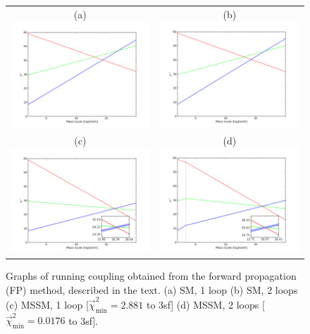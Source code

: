 \documentclass[12pt,a4paper,oneside]{article}
\begin{document}
\begin{figure}[th]
\begin{center}
\begin{tabular}{cc}
(a) \includegraphics[width=6.75cm]{figs/sm-1.png} & (b) \includegraphics[width=6.75cm]{figs/sm-2.png} \\
(c) \includegraphics[width=6.75cm]{figs/mssm-1.png} & (d) \includegraphics[width=6.75cm]{figs/mssm-2.png} \\
\end{tabular}
\caption[]{Graphs of running coupling obtained from the forward propagation (FP) method, described in the text. (a) SM, 1 loop (b) SM, 2 loops (c) MSSM, 1 loop [$\overrightarrow{\chi}^2_\mathrm{min} = 2.881$ to 3sf] (d) MSSM, 2 loops [$\overrightarrow{\chi}^2_\mathrm{min} = 0.0176$ to 3sf].}
\label{fig:nofit}
\end{center}
\end{figure}
\end{document}
